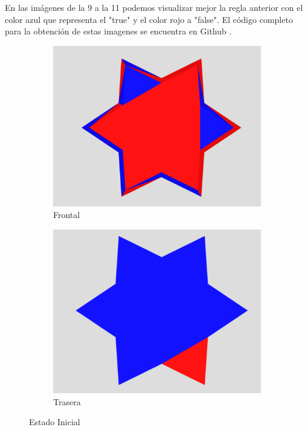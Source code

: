 \documentclass{article}
\begin{document}
En las imágenes de la 9 a la 11 podemos visualizar mejor la regla anterior con el color azul que representa el "true" y el color rojo a "false".
El código completo para la obtención de estas imagenes se encuentra en Github \cite{Denisse_Leyva}.

\begin{figure}[H]
\centering
\begin{subfigure}[b]{0.45\linewidth}
\includegraphics[width=\linewidth]{star_1.png}
\caption{Frontal}
\end{subfigure}
\begin{subfigure}[b]{0.45\linewidth}
\includegraphics[width=\linewidth]{star_1_1.png}
\caption{Trasera}
\end{subfigure}
\caption{Estado Inicial}
\label{fig:westminster}
\end{figure}
\end{document}
